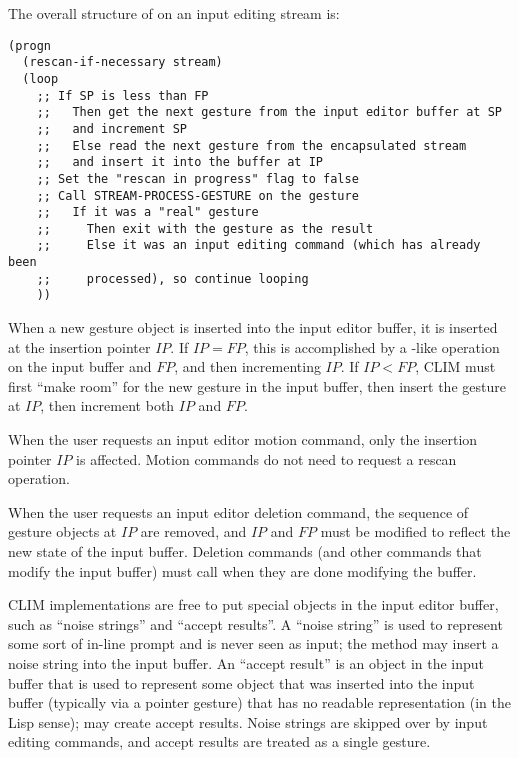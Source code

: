 The overall structure of  on an input editing stream is:

\begin{verbatim}
(progn
  (rescan-if-necessary stream)
  (loop
    ;; If SP is less than FP
    ;;   Then get the next gesture from the input editor buffer at SP
    ;;   and increment SP
    ;;   Else read the next gesture from the encapsulated stream
    ;;   and insert it into the buffer at IP
    ;; Set the "rescan in progress" flag to false
    ;; Call STREAM-PROCESS-GESTURE on the gesture
    ;;   If it was a "real" gesture
    ;;     Then exit with the gesture as the result
    ;;     Else it was an input editing command (which has already been
    ;;     processed), so continue looping
    ))
\end{verbatim}

When a new gesture object is inserted into the input editor buffer, it is
inserted at the insertion pointer $IP$.  If $IP = FP$, this is accomplished by a
-like operation on the input buffer and $FP$, and then
incrementing $IP$.  If $IP < FP$, CLIM must first ``make room'' for the new
gesture in the input buffer, then insert the gesture at $IP$, then increment
both $IP$ and $FP$.

When the user requests an input editor motion command, only the insertion
pointer $IP$ is affected.  Motion commands do not need to request a rescan
operation.

When the user requests an input editor deletion command, the sequence of gesture
objects at $IP$ are removed, and $IP$ and $FP$ must be modified to reflect the
new state of the input buffer.  Deletion commands (and other commands that
modify the input buffer) must call  when they are done
modifying the buffer.

CLIM implementations are free to put special objects in the input editor buffer,
such as ``noise strings'' and ``accept results''.  A ``noise string'' is used to
represent some sort of in-line prompt and is never seen as input; the
 method may insert a noise string into the input buffer.
An ``accept result'' is an object in the input buffer that is used to represent
some object that was inserted into the input buffer (typically via a pointer
gesture) that has no readable representation (in the Lisp sense);
 may create accept results.  Noise strings are
skipped over by input editing commands, and accept results are treated as a
single gesture.


